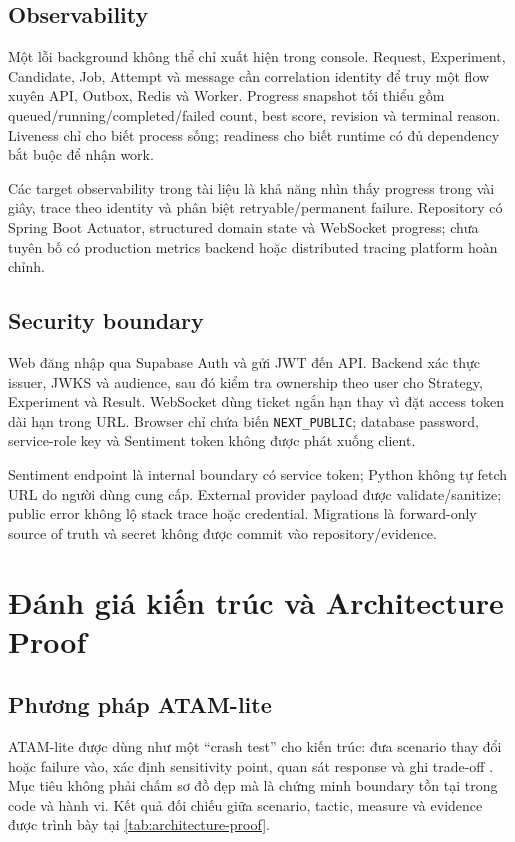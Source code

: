 \documentclass[12pt,a4paper,oneside]{report}
\begin{document}
\section{Observability}

Một lỗi background không thể chỉ xuất hiện trong console. Request, Experiment, Candidate, Job, Attempt và message cần correlation identity để truy một flow xuyên API, Outbox, Redis và Worker. Progress snapshot tối thiểu gồm queued/running/completed/failed count, best score, revision và terminal reason. Liveness chỉ cho biết process sống; readiness cho biết runtime có đủ dependency bắt buộc để nhận work.

Các target observability trong tài liệu là khả năng nhìn thấy progress trong vài giây, trace theo identity và phân biệt retryable/permanent failure. Repository có Spring Boot Actuator, structured domain state và WebSocket progress; chưa tuyên bố có production metrics backend hoặc distributed tracing platform hoàn chỉnh.

\section{Security boundary}

Web đăng nhập qua Supabase Auth và gửi JWT đến API. Backend xác thực issuer, JWKS và audience, sau đó kiểm tra ownership theo user cho Strategy, Experiment và Result. WebSocket dùng ticket ngắn hạn thay vì đặt access token dài hạn trong URL. Browser chỉ chứa biến \texttt{NEXT\_PUBLIC}; database password, service-role key và Sentiment token không được phát xuống client.

Sentiment endpoint là internal boundary có service token; Python không tự fetch URL do người dùng cung cấp. External provider payload được validate/sanitize; public error không lộ stack trace hoặc credential. Migrations là forward-only source of truth và secret không được commit vào repository/evidence.

\chapter{Đánh giá kiến trúc và Architecture Proof}
\label{chap:evaluation}

\section{Phương pháp ATAM-lite}

ATAM-lite được dùng như một ``crash test'' cho kiến trúc: đưa scenario thay đổi hoặc failure vào, xác định sensitivity point, quan sát response và ghi trade-off \cite{bass2021,cervantes2016}. Mục tiêu không phải chấm sơ đồ đẹp mà là chứng minh boundary tồn tại trong code và hành vi.
Kết quả đối chiếu giữa scenario, tactic, measure và evidence được trình bày tại \cref{tab:architecture-proof}.
\end{document}

